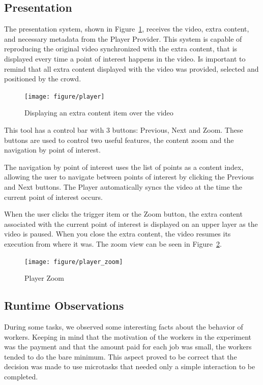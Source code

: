 \subsection{Presentation}

The presentation system, shown in Figure~\ref{player}, receives the video, extra content, and necessary metadata from the Player Provider. This system is capable of reproducing the original video synchronized with the extra content, that is displayed every time a point of interest happens in the video. Is important to remind that all extra content displayed with the video was provided, selected and positioned by the crowd.



\begin{figure}[h!]
	\centerline{\texttt{[image: figure/player]}}
	\caption{Displaying an extra content item over the video}
	\label{player}
\end{figure}

This tool has a control bar with 3 buttons: Previous, Next and Zoom. These buttons are used to control two useful features, the content zoom and the navigation by point of interest.

The navigation by point of interest uses the list of points as a content index, allowing the user to navigate between points of interest by clicking the Previous and Next buttons. The Player automatically syncs the video at the time the current point of interest occurs.

When the user clicks the trigger item or the Zoom button, the extra content associated with the current point of interest is displayed on an upper layer as the video is paused. When you close the extra content, the video resumes its execution from where it was. The zoom view can be seen in Figure~\ref{player_zoom}.

\begin{figure}[h!]
	\centerline{\texttt{[image: figure/player\_zoom]}}
	\caption{Player Zoom}
	\label{player_zoom}
\end{figure}



 \subsection{Runtime Observations}
 
During some tasks, we observed some interesting facts about the behavior of workers. Keeping in mind that the motivation of the workers in the experiment was the payment and that the amount paid for each job was small, the workers tended to do the bare minimum. This aspect proved to be correct that the decision was made to use microtasks that needed only a simple interaction to be completed.
 
